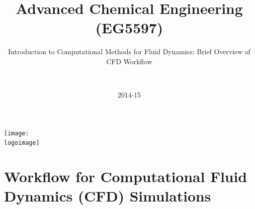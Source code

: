 \documentclass[10pt,compress,handout,ignorenonframetext]{beamer}
\institute{School of Engineering}
\title{Advanced Chemical Engineering (EG5597)}
\subtitle{Introduction to Computational Methods for Fluid Dynamics: Brief Overview of CFD Workflow}
\date[2014-15]{2014-15}
\author[\shortname]{%
  \fullname\\\ttfamily{\emailaddress}
}
\newcommand{\logoimage}{./FigBanner/UoAHorizBanner}
\begin{document}
\begin{frame}
  \titlepage
  \vfill%
  \begin{center}
    \texttt{[image: \\logoimage]}
  \end{center}
\end{frame}






\section{Workflow for Computational Fluid Dynamics (CFD) Simulations}

\end{document}
